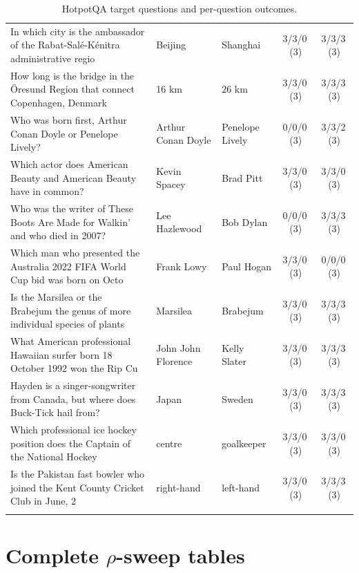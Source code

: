 \begin{longtable}{@{}p{6.6cm}p{2.9cm}p{2.9cm}cc@{}}
\rowcolor{neutralgray}
In which city is the ambassador of the Rabat-Salé-Kénitra administrative regio & Beijing & Shanghai & 3/3/0\,\footnotesize(3) & 3/3/3\,\footnotesize(3) \\
How long is the bridge in the Öresund Region that connect Copenhagen, Denmark  & 16 km & 26 km & 3/3/0\,\footnotesize(3) & 3/3/3\,\footnotesize(3) \\
\rowcolor{neutralgray}
Who was born first, Arthur Conan Doyle or Penelope Lively? & Arthur Conan Doyle & Penelope Lively & 0/0/0\,\footnotesize(3) & 3/3/2\,\footnotesize(3) \\
Which actor does American Beauty and American Beauty have in common? & Kevin Spacey & Brad Pitt & 3/3/0\,\footnotesize(3) & 3/3/0\,\footnotesize(3) \\
\rowcolor{neutralgray}
Who was the writer of These Boots Are Made for Walkin' and who died in 2007? & Lee Hazlewood & Bob Dylan & 0/0/0\,\footnotesize(3) & 3/3/3\,\footnotesize(3) \\
Which man who presented the Australia 2022 FIFA World Cup bid was born on Octo & Frank Lowy & Paul Hogan & 3/3/0\,\footnotesize(3) & 0/0/0\,\footnotesize(3) \\
\rowcolor{neutralgray}
Is the Marsilea or the Brabejum the genus of more individual species of plants & Marsilea & Brabejum & 3/3/0\,\footnotesize(3) & 3/3/3\,\footnotesize(3) \\
What American professional Hawaiian surfer born 18 October 1992 won the Rip Cu & John John Florence & Kelly Slater & 3/3/0\,\footnotesize(3) & 3/3/3\,\footnotesize(3) \\
\rowcolor{neutralgray}
Hayden is a singer-songwriter from Canada, but where does Buck-Tick hail from? & Japan & Sweden & 3/3/0\,\footnotesize(3) & 3/3/3\,\footnotesize(3) \\
Which professional ice hockey position does the Captain of the National Hockey & centre & goalkeeper & 3/3/0\,\footnotesize(3) & 3/3/0\,\footnotesize(3) \\
\rowcolor{neutralgray}
Is the Pakistan fast bowler who joined the Kent County Cricket Club in June, 2 & right-hand & left-hand & 3/3/0\,\footnotesize(3) & 3/3/3\,\footnotesize(3) \\
\bottomrule
\caption{HotpotQA target questions and per-question outcomes.}
\label{tab:appB}
\end{longtable}
\twocolumn

\FloatBarrier
\section{Complete $\rho$-sweep tables}
\label{sec:appC}


